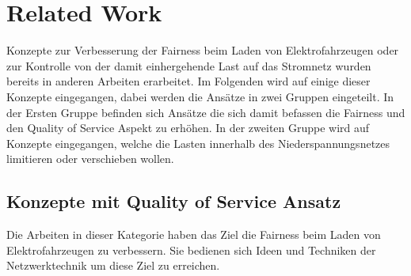 \chapter{Related Work}
Konzepte zur Verbesserung der Fairness beim Laden von Elektrofahrzeugen oder zur Kontrolle von der damit einhergehende Last auf das Stromnetz wurden bereits in anderen Arbeiten erarbeitet. Im Folgenden wird auf einige dieser Konzepte eingegangen, dabei werden die Ansätze in zwei Gruppen eingeteilt. In der Ersten Gruppe befinden sich Ansätze die sich damit befassen die Fairness und den Quality of Service Aspekt zu erhöhen. In der zweiten Gruppe wird auf Konzepte eingegangen, welche die Lasten innerhalb des Niederspannungsnetzes limitieren oder verschieben wollen.
\section{Konzepte mit Quality of Service Ansatz}
Die Arbeiten in dieser Kategorie haben das Ziel die Fairness beim Laden von Elektrofahrzeugen zu verbessern. Sie bedienen sich Ideen und Techniken der Netzwerktechnik um diese Ziel zu erreichen.\\
